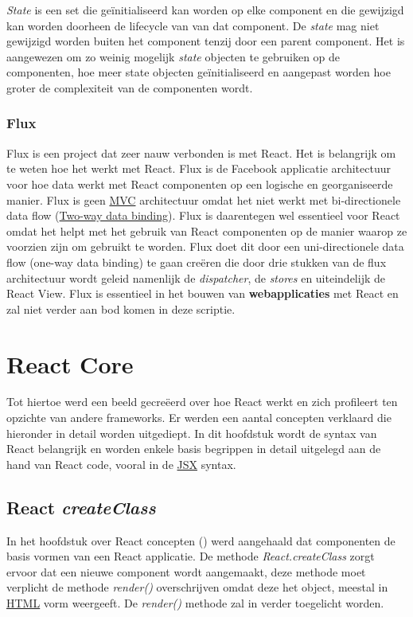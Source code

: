 		\emph{State} is een set die geïnitialiseerd kan worden op elke component en die gewijzigd kan worden doorheen de lifecycle van van dat component. De \emph{state} mag niet gewijzigd worden buiten het component tenzij door een parent component. Het is aangewezen om zo weinig mogelijk \emph{state} objecten te gebruiken op de componenten, hoe meer state objecten geïnitialiseerd en aangepast worden hoe groter de complexiteit van de componenten wordt.
	
	\subsubsection{Flux}
		
		Flux is een project dat zeer nauw verbonden is met React. Het is belangrijk om te weten hoe het werkt met React. Flux is de Facebook applicatie architectuur voor hoe data werkt met React componenten op een logische en georganiseerde manier. Flux is geen \hyperref[mvc]{MVC} architectuur omdat het niet werkt met bi-directionele data flow (\hyperref[twdb]{Two-way data binding}). Flux is daarentegen wel essentieel voor React omdat het helpt met het gebruik van React componenten op de manier waarop ze voorzien zijn om gebruikt te worden. Flux doet dit door een uni-directionele data flow (one-way data binding) te gaan creëren die door drie stukken van de flux architectuur wordt geleid namenlijk de \emph{dispatcher}, de \emph{stores} en uiteindelijk de React View. Flux is essentieel in het bouwen van \textbf{webapplicaties} met React en zal niet verder aan bod komen in deze scriptie.

\section{React Core}
	
	Tot hiertoe werd een beeld gecreëerd over hoe React werkt en zich profileert ten opzichte van andere frameworks. Er werden een aantal concepten verklaard die hieronder in detail worden uitgediept. In dit hoofdstuk wordt de syntax van React belangrijk en worden enkele basis begrippen in detail uitgelegd aan de hand van React code, vooral in de \hyperref[jsx]{JSX} syntax.
	
	\subsection{React \emph{createClass}}
		
		In het hoofdstuk over React concepten () werd aangehaald dat componenten de basis vormen van een React applicatie. De methode \emph{React.createClass} zorgt ervoor dat een nieuwe component wordt aangemaakt, deze methode moet verplicht de methode \emph{render()} overschrijven omdat deze het object, meestal in \hyperref[html]{HTML} vorm weergeeft. De \emph{render()} methode zal in  verder toegelicht worden.
		
